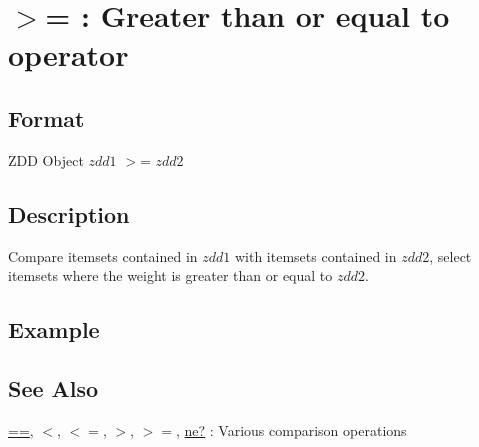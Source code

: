 
\section{$>$= : Greater than or equal to operator\label{sect:ge}}
\subsection*{Format}
ZDD Object  $zdd1$ $>$= $zdd2$

\subsection*{Description}
Compare itemsets contained in $zdd1$ with itemsets contained in $zdd2$, select itemsets where the weight is greater than or equal to $zdd2$.  

\subsection*{Example}


\subsection*{See Also}
\hyperref[sect:eq]{==},
\hyperref[sect:lt]{$<$},
\hyperref[sect:le]{$<=$},
\hyperref[sect:gt]{$>$},
\hyperref[sect:ge]{$>=$},
\hyperref[sect:ne]{ne?} : Various comparison operations
